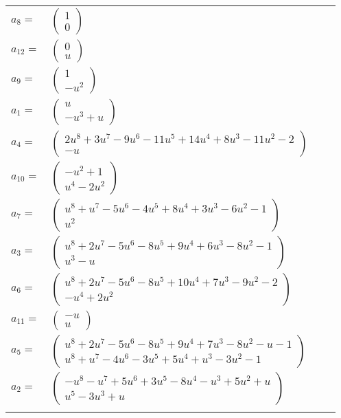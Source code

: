 \documentclass[1p]{elsarticle_modified}
\theoremstyle{definition}
\begin{document}
\begin{tabular}{m{7pt} m{180pt} m{7pt} m{180pt} }
\flushright $a_{8}=$&$\begin{pmatrix}1\\0\end{pmatrix}$ \\
\flushright $a_{12}=$&$\begin{pmatrix}0\\u\end{pmatrix}$ \\
\flushright $a_{9}=$&$\begin{pmatrix}1\\- u^2\end{pmatrix}$ \\
\flushright $a_{1}=$&$\begin{pmatrix}u\\- u^3+u\end{pmatrix}$ \\
\flushright $a_{4}=$&$\begin{pmatrix}2 u^8+3 u^7-9 u^6-11 u^5+14 u^4+8 u^3-11 u^2-2\\- u\end{pmatrix}$ \\
\flushright $a_{10}=$&$\begin{pmatrix}- u^2+1\\u^4-2 u^2\end{pmatrix}$ \\
\flushright $a_{7}=$&$\begin{pmatrix}u^8+u^7-5 u^6-4 u^5+8 u^4+3 u^3-6 u^2-1\\u^2\end{pmatrix}$ \\
\flushright $a_{3}=$&$\begin{pmatrix}u^8+2 u^7-5 u^6-8 u^5+9 u^4+6 u^3-8 u^2-1\\u^3- u\end{pmatrix}$ \\
\flushright $a_{6}=$&$\begin{pmatrix}u^8+2 u^7-5 u^6-8 u^5+10 u^4+7 u^3-9 u^2-2\\- u^4+2 u^2\end{pmatrix}$ \\
\flushright $a_{11}=$&$\begin{pmatrix}- u\\u\end{pmatrix}$ \\
\flushright $a_{5}=$&$\begin{pmatrix}u^8+2 u^7-5 u^6-8 u^5+9 u^4+7 u^3-8 u^2- u-1\\u^8+u^7-4 u^6-3 u^5+5 u^4+u^3-3 u^2-1\end{pmatrix}$ \\
\flushright $a_{2}=$&$\begin{pmatrix}- u^8- u^7+5 u^6+3 u^5-8 u^4- u^3+5 u^2+u\\u^5-3 u^3+u\end{pmatrix}$\\&\end{tabular}
\end{document}
